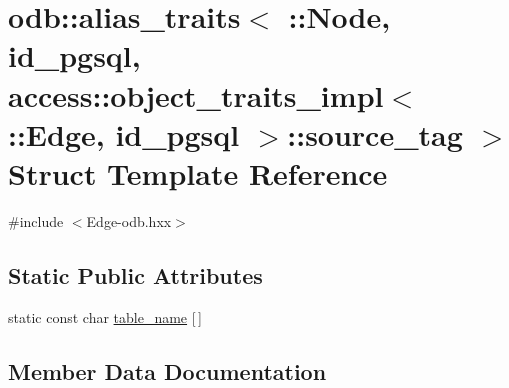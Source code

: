 \hypertarget{structodb_1_1alias__traits_3_01_1_1_node_00_01id__pgsql_00_01access_1_1object__traits__impl_3_01db58b174ecb0ad95fbb7b688e9500987}{}\section{odb\+:\+:alias\+\_\+traits$<$ \+:\+:Node, id\+\_\+pgsql, access\+:\+:object\+\_\+traits\+\_\+impl$<$ \+:\+:Edge, id\+\_\+pgsql $>$\+:\+:source\+\_\+tag $>$ Struct Template Reference}
\label{structodb_1_1alias__traits_3_01_1_1_node_00_01id__pgsql_00_01access_1_1object__traits__impl_3_01db58b174ecb0ad95fbb7b688e9500987}


{\ttfamily \#include $<$Edge-\/odb.\+hxx$>$}

\subsection*{Static Public Attributes}
\begin{DoxyCompactItemize}
\item 
static const char \hyperlink{structodb_1_1alias__traits_3_01_1_1_node_00_01id__pgsql_00_01access_1_1object__traits__impl_3_01db58b174ecb0ad95fbb7b688e9500987_a0201ddf009a497b04811e26b75ee897f}{table\+\_\+name} \mbox{[}$\,$\mbox{]}
\end{DoxyCompactItemize}


\subsection{Member Data Documentation}
\hypertarget{structodb_1_1alias__traits_3_01_1_1_node_00_01id__pgsql_00_01access_1_1object__traits__impl_3_01db58b174ecb0ad95fbb7b688e9500987_a0201ddf009a497b04811e26b75ee897f}{}
